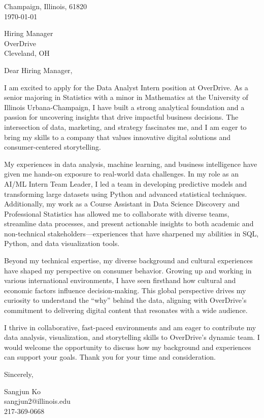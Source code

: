 \documentclass[11pt]{article}
\begin{document}
\noindent
Champaign, Illinois, 61820 \\
\today
\vspace{2em}

\noindent
Hiring Manager\\
OverDrive\\
Cleveland, OH

\vspace{1.5em}
Dear Hiring Manager,

I am excited to apply for the Data Analyst Intern position at OverDrive. As a senior majoring in Statistics with a minor in Mathematics at the University of Illinois Urbana-Champaign, I have built a strong analytical foundation and a passion for uncovering insights that drive impactful business decisions. The intersection of data, marketing, and strategy fascinates me, and I am eager to bring my skills to a company that values innovative digital solutions and consumer-centered storytelling.

My experiences in data analysis, machine learning, and business intelligence have given me hands-on exposure to real-world data challenges. In my role as an AI/ML Intern Team Leader, I led a team in developing predictive models and transforming large datasets using Python and advanced statistical techniques. Additionally, my work as a Course Assistant in Data Science Discovery and Professional Statistics has allowed me to collaborate with diverse teams, streamline data processes, and present actionable insights to both academic and non-technical stakeholders—experiences that have sharpened my abilities in SQL, Python, and data visualization tools.

Beyond my technical expertise, my diverse background and cultural experiences have shaped my perspective on consumer behavior. Growing up and working in various international environments, I have seen firsthand how cultural and economic factors influence decision-making. This global perspective drives my curiosity to understand the “why” behind the data, aligning with OverDrive’s commitment to delivering digital content that resonates with a wide audience.

I thrive in collaborative, fast-paced environments and am eager to contribute my data analysis, visualization, and storytelling skills to OverDrive’s dynamic team. I would welcome the opportunity to discuss how my background and experiences can support your goals. Thank you for your time and consideration.

\vspace{1em}

Sincerely,

\vspace{2em}

\noindent
Sangjun Ko\\
sangjun2@illinois.edu\\
217-369-0668
\end{document}
